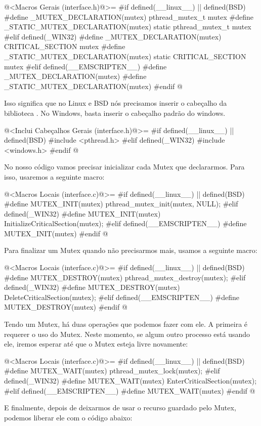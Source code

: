 \iniciocodigo
@<Macros Gerais (interface.h)@>=
#if defined(__linux__) || defined(BSD)
#define _MUTEX_DECLARATION(mutex) pthread_mutex_t mutex
#define _STATIC_MUTEX_DECLARATION(mutex) static pthread_mutex_t mutex
#elif defined(_WIN32)
#define _MUTEX_DECLARATION(mutex) CRITICAL_SECTION mutex
#define _STATIC_MUTEX_DECLARATION(mutex) static CRITICAL_SECTION mutex
#elif defined(__EMSCRIPTEN__)
#define _MUTEX_DECLARATION(mutex)
#define _STATIC_MUTEX_DECLARATION(mutex)
#endif
@
\fimcodigo

Isso significa que no Linux e BSD nós precisamos inserir o cabeçalho
da biblioteca . No Windows, basta inserir o
cabeçalho padrão do windows.

\iniciocodigo
@<Inclui Cabeçalhos Gerais (interface.h)@>=
#if defined(__linux__) || defined(BSD)
#include <pthread.h>
#elif defined(_WIN32)
#include <windows.h>
#endif
@
\fimcodigo

No nosso código vamos precisar inicializar cada Mutex que
declararmos. Para isso, usaremos a seguinte macro:

\iniciocodigo
@<Macros Locais (interface.c)@>=
#if defined(__linux__) || defined(BSD)
#define MUTEX_INIT(mutex) pthread_mutex_init(mutex, NULL);
#elif defined(_WIN32)
#define MUTEX_INIT(mutex) InitializeCriticalSection(mutex);
#elif defined(__EMSCRIPTEN__)
#define MUTEX_INIT(mutex)
#endif
@
\fimcodigo

Para finalizar um Mutex quando não precisarmos mais, usamos a seguinte
macro:

\iniciocodigo
@<Macros Locais (interface.c)@>=
#if defined(__linux__) || defined(BSD)
#define MUTEX_DESTROY(mutex) pthread_mutex_destroy(mutex);
#elif defined(_WIN32)
#define MUTEX_DESTROY(mutex) DeleteCriticalSection(mutex);
#elif defined(__EMSCRIPTEN__)
#define MUTEX_DESTROY(mutex)
#endif
@
\fimcodigo

Tendo um Mutex, há duas operações que podemos fazer com ele. A
primeira é requerer o uso do Mutex. Neste momento, se algum outro
processo está usando ele, iremos esperar até que o Mutex esteja livre
novamente:

\iniciocodigo
@<Macros Locais (interface.c)@>=
#if defined(__linux__) || defined(BSD)
#define MUTEX_WAIT(mutex) pthread_mutex_lock(mutex);
#elif defined(_WIN32)
#define MUTEX_WAIT(mutex) EnterCriticalSection(mutex);
#elif defined(__EMSCRIPTEN__)
#define MUTEX_WAIT(mutex)
#endif
@
\fimcodigo

E finalmente, depois de deixarmos de usar o recurso guardado pelo
Mutex, podemos liberar ele com o código abaixo:

